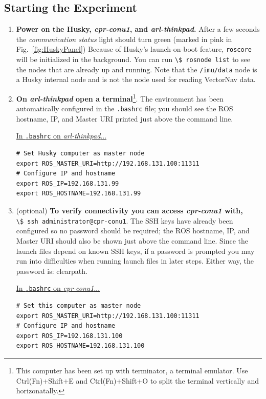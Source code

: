 \documentclass[
	12pt, %
]{fphw}
\newcommand{\code}[1]{\colorbox{light-gray}{\lstinline|#1|}}
\begin{document}
\subsection{Starting the Experiment}
\begin{enumerate}
\item \textbf{Power on the Husky, \emph{cpr-conu1}, and \emph{arl-thinkpad}.} After a few seconds the \emph{communication status} light should turn green (marked in pink in Fig.~\ref{fig:HuskyPanel}) Because of Husky's launch-on-boot feature, \code{roscore} will be initialized in the background. You can run \code{\$ rosnode list} to see the nodes that are already up and running. Note that the \code{/imu/data} node is a Husky internal node and is not the node used for reading VectorNav data.

\item \textbf{On \emph{arl-thinkpad} open a terminal}\footnote{This computer has been set up with terminator, a terminal emulator. Use Ctrl(Fn)+Shift+E and Ctrl(Fn)+Shift+O to split the terminal vertically and horizonatally.}. The environment has been automatically configured in the \code{.bashrc} file; you should see the ROS hostname, IP, and Master URI printed just above the command line.

\underline{In \code{.bashrc} on \emph{arl-thinkpad}...}

\begin{lstlisting}
# Set Husky computer as master node
export ROS_MASTER_URI=http://192.168.131.100:11311
# Configure IP and hostname
export ROS_IP=192.168.131.99
export ROS_HOSTNAME=192.168.131.99
\end{lstlisting}
  
\item (optional) \textbf{To verify connectivity you can access \emph{cpr-conu1} with,} \\
  \code{\$ ssh administrator@cpr-conu1}. The SSH keys have already been configured so no password should be required; the ROS hostname, IP, and Master URI should also be shown just above the command line. Since the launch files depend on known SSH keys, if a password is prompted you may run into difficulties when running launch files in later steps. Either way, the password is: clearpath.
  
\underline{In \code{.bashrc} on \emph{cpr-conu1}...}
  
\begin{lstlisting}
# Set this computer as master node
export ROS_MASTER_URI=http://192.168.131.100:11311
# Configure IP and hostname
export ROS_IP=192.168.131.100
export ROS_HOSTNAME=192.168.131.100
\end{lstlisting}


\end{enumerate}
\end{document}
